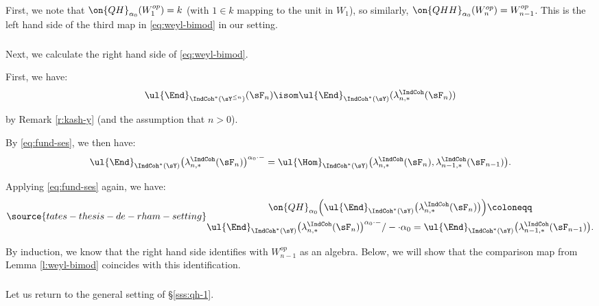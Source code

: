 \subsubsection{}

First, we note that $\on{QH}_{\alpha_0}(W_1^{op}) = k$ (with $1 \in k$ mapping to the
unit in $W_1$), so similarly,
$\on{QHH}_{\alpha_0}(W_n^{op}) = W_{n-1}^{op}$. This is the left hand side of
the third map in \eqref{eq:weyl-bimod} in our setting.

\subsubsection{}

Next, we calculate the right hand side of \eqref{eq:weyl-bimod}.

First, we have:
%
\[
\ul{\End}_{\IndCoh^*(\sY^{\leq n})}(\sF_n) \isom
\ul{\End}_{\IndCoh^*(\sY)}(\lambda_{n,*}^{\IndCoh}(\sF_n))
\]

 by Remark \ref{r:kash-y} (and the assumption that $n>0$).

By \eqref{eq:fund-ses}, we then have:
%
\[
\ul{\End}_{\IndCoh^*(\sY)}\big(\lambda_{n,*}^{\IndCoh}(\sF_n)\big)^{\alpha_0\cdot-} =
\ul{\Hom}_{\IndCoh^*(\sY)}\big(\lambda_{n,*}^{\IndCoh}(\sF_n),
\lambda_{n-1,*}^{\IndCoh}(\sF_{n-1})\big).
\]

 Applying \eqref{eq:fund-ses} again, we have:
%
\begin{equation}\label{eq:qh-end}
\source{tates-thesis-de-rham-setting}
\begin{gathered}
\on{QH}_{\alpha_0}\Big(\ul{\End}_{\IndCoh^*(\sY)}\big(\lambda_{n,*}^{\IndCoh}(\sF_n)\big)\Big)
\coloneqq \\
\ul{\End}_{\IndCoh^*(\sY)}\big(\lambda_{n,*}^{\IndCoh}(\sF_n)\big)^{\alpha_0\cdot-}/-\cdot\alpha_0 =
\ul{\End}_{\IndCoh^*(\sY)}\big(\lambda_{n-1,*}^{\IndCoh}(\sF_{n-1})\big).
\end{gathered}
\end{equation}

By induction, we know that the right hand side identifies with
$W_{n-1}^{op}$ as an algebra. Below, we will show that the
comparison map from Lemma \ref{l:weyl-bimod} coincides with this
identification.

\subsubsection{}

Let us return to the general setting of \S \ref{sss:qh-1}.

